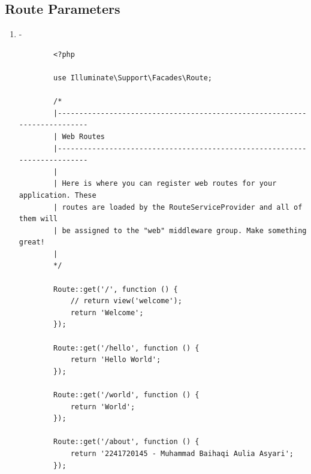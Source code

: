 \documentclass[12pt,titlepage]{article}
\begin{document}
\newpage

\subsection{Route Parameters}
\begin{enumerate}[label=\alph*.]
    \item -
    \begin{verbatim}
        <?php

        use Illuminate\Support\Facades\Route;
        
        /*
        |--------------------------------------------------------------------------
        | Web Routes
        |--------------------------------------------------------------------------
        |
        | Here is where you can register web routes for your application. These
        | routes are loaded by the RouteServiceProvider and all of them will
        | be assigned to the "web" middleware group. Make something great!
        |
        */
        
        Route::get('/', function () {
            // return view('welcome');
            return 'Welcome';
        });
        
        Route::get('/hello', function () {
            return 'Hello World';
        });
        
        Route::get('/world', function () {
            return 'World';
        }); 
        
        Route::get('/about', function () {
            return '2241720145 - Muhammad Baihaqi Aulia Asyari';
        }); 
        

\end{verbatim}
\end{enumerate}
\end{document}
